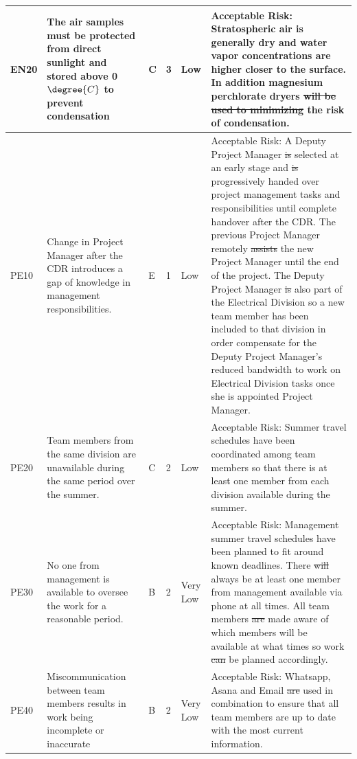 \documentclass[a4paper,12pt,oneside]{article}
\providecommand{\DIFaddtex}[1]{{\protect\color{blue}\uwave{#1}}} %
\providecommand{\DIFdeltex}[1]{{\protect\color{red}\sout{#1}}}                      %
\providecommand{\DIFaddbegin}{} %
\providecommand{\DIFaddend}{} %
\providecommand{\DIFdelbegin}{} %
\providecommand{\DIFdelend}{} %
\providecommand{\DIFadd}[1]{\texorpdfstring{\DIFaddtex{#1}}{#1}} %
\providecommand{\DIFdel}[1]{\texorpdfstring{\DIFdeltex{#1}}{}} %
\newcommand{\DIFscaledelfig}{0.5}
\newlength{\DIFdelgraphicswidth} %
\newlength{\DIFdelgraphicsheight} %
\newcommand{\DIFaddincludegraphics}[2][]{{\color{blue}\fbox{\DIFOincludegraphics[#1]{#2}}}} %
\newcommand{\DIFdelincludegraphics}[2][]{%
\sbox{\DIFdelgraphicsbox}{\DIFOincludegraphics[#1]{#2}}%
\settoboxwidth{\DIFdelgraphicswidth}{\DIFdelgraphicsbox} %
\settoboxtotalheight{\DIFdelgraphicsheight}{\DIFdelgraphicsbox} %
\scalebox{\DIFscaledelfig}{%
\parbox[b]{\DIFdelgraphicswidth}{\usebox{\DIFdelgraphicsbox}\\[-\baselineskip] \rule{\DIFdelgraphicswidth}{0em}}\llap{\resizebox{\DIFdelgraphicswidth}{\DIFdelgraphicsheight}{%
\setlength{\unitlength}{\DIFdelgraphicswidth}%
\begin{picture}(1,1)%
\thicklines\linethickness{2pt} %
{\color[rgb]{1,0,0}\put(0,0){\framebox(1,1){}}}%
{\color[rgb]{1,0,0}\put(0,0){\line( 1,1){1}}}%
{\color[rgb]{1,0,0}\put(0,1){\line(1,-1){1}}}%
\end{picture}%
}\hspace*{3pt}}} %
} %
\DeclareRobustCommand{\DIFaddbegin}{\DIFOaddbegin \let\includegraphics\DIFaddincludegraphics} %
\DeclareRobustCommand{\DIFaddend}{\DIFOaddend \let\includegraphics\DIFOincludegraphics} %
\DeclareRobustCommand{\DIFdelbegin}{\DIFOdelbegin \let\includegraphics\DIFdelincludegraphics} %
\DeclareRobustCommand{\DIFdelend}{\DIFOaddend \let\includegraphics\DIFOincludegraphics} %
\begin{document}
\begin{landscape}
\begin{longtable}{|m{}| m{} |m{} |m{}|m{}| m{}|}
EN20 & The air samples must be protected from direct sunlight and stored above 0$\degree{C}$ to prevent condensation & C & 3 & \cellcolor[HTML]{FCFF2F}Low & Acceptable Risk: Stratospheric air is generally dry and water vapor concentrations are higher closer to the surface. In addition magnesium perchlorate dryers \DIFdelbegin \DIFdel{will be used to minimizing }\DIFdelend \DIFaddbegin \DIFadd{were used to minimize }\DIFaddend the risk of condensation.    \\ \hline 
PE10 & Change in Project Manager after the CDR introduces a gap of knowledge in management responsibilities. & E & 1 & \cellcolor[HTML]{FCFF2F}Low & Acceptable Risk: A Deputy Project Manager \DIFdelbegin \DIFdel{is }\DIFdelend \DIFaddbegin \DIFadd{was }\DIFaddend selected at an early stage and \DIFdelbegin \DIFdel{is }\DIFdelend \DIFaddbegin \DIFadd{was }\DIFaddend progressively handed over project management tasks and responsibilities until complete handover after the CDR. The previous Project Manager remotely \DIFdelbegin \DIFdel{assists }\DIFdelend \DIFaddbegin \DIFadd{assisted }\DIFaddend the new Project Manager until the end of the project. The Deputy Project Manager \DIFdelbegin \DIFdel{is }\DIFdelend \DIFaddbegin \DIFadd{was }\DIFaddend also part of the Electrical Division so a new team member has been included to that division in order compensate for the Deputy Project Manager's reduced bandwidth to work on Electrical Division tasks once she is appointed Project Manager.\\ \hline 
PE20 & Team members from the same division are unavailable during the same period over the summer. & C & 2 & \cellcolor[HTML]{FCFF2F}Low & Acceptable Risk: Summer travel schedules have been coordinated among team members so that there is at least one member from each division available during the summer. \\ \hline
PE30 & No one from management is available to oversee the work for a reasonable period. & B & 2 & \cellcolor[HTML]{34FF34}Very Low & Acceptable Risk: Management summer travel schedules have been planned to fit around known deadlines. There \DIFdelbegin \DIFdel{will }\DIFdelend \DIFaddbegin \DIFadd{was }\DIFaddend always be at least one member from management available via phone at all times. All team members \DIFdelbegin \DIFdel{are }\DIFdelend \DIFaddbegin \DIFadd{were }\DIFaddend made aware of which members will be available at what times so work \DIFdelbegin \DIFdel{can }\DIFdelend \DIFaddbegin \DIFadd{could }\DIFaddend be planned accordingly. \\ \hline
PE40 & Miscommunication between team members results in work being incomplete or inaccurate & B & 2 & \cellcolor[HTML]{34FF34}Very Low & Acceptable Risk: Whatsapp, Asana and Email \DIFdelbegin \DIFdel{are }\DIFdelend \DIFaddbegin \DIFadd{were }\DIFaddend used in combination to ensure that all team members are up to date with the most current information. \\ \hline


\end{longtable}
\end{landscape}
\end{document}
